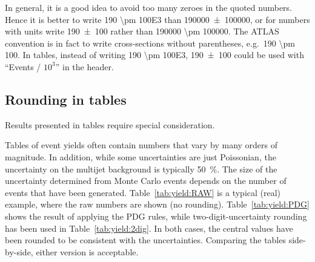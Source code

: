 \documentclass[UKenglish]{latex/atlasdoc}
\begin{document}
In general, it is a good idea
to avoid too many zeroes in the quoted numbers. Hence it is better
to write \num{190 \pm 100E3} than \num{190000 \pm 100000}, or for
numbers with units write \SI{190 \pm 100}{\nb} rather than \SI{190000
  \pm 100000}{\pb}. The ATLAS convention is in fact to write cross-sections
without parentheses, e.g.\ \SI[multi-part-units=single]{190 \pm
  100}{\nb}. In tables, instead of writing \num{190 \pm 100E3},
\num{190 \pm 100} could be used with \enquote{Events / $10^3$} in
the header.

\subsection{Rounding in tables}
\label{sec:recc:table}

Results presented in tables require special consideration.

Tables of event yields often contain numbers that vary by many orders
of magnitude. In addition, while some uncertainties are just Poissonian, the
uncertainty on the multijet background is typically
\SI{50}{\percent}. The size of the uncertainty determined from Monte Carlo
events depends on the number of events that have been
generated. Table~\ref{tab:yield:RAW} is a typical (real) example, where the
raw numbers are shown (no rounding).  Table~\ref{tab:yield:PDG} shows the
result of applying the PDG rules, while two-digit-uncertainty rounding has
been used in Table~\ref{tab:yield:2dig}.  In both cases, the central values
have been rounded to be consistent with the uncertainties. Comparing the
tables side-by-side, either version is acceptable.  
\end{document}
